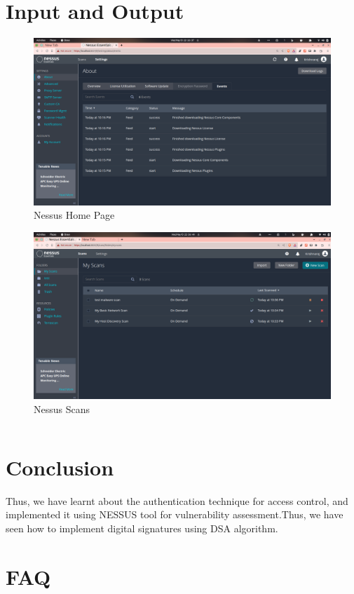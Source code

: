 \documentclass[11pt]{article}
\begin{document}
\section{Input and Output}
\begin{figure}[H]
    \centering
    \includegraphics[width=.45\textwidth]{nessus 1.png}
    \caption{Nessus Home Page}
\end{figure}
\begin{figure}[H]
    \centering
    \includegraphics[width=.45\textwidth]{nessus 2.png}
    \caption{Nessus Scans}
\end{figure}
\begin{verbatim}
\end{verbatim}


% 

\section{Conclusion}
Thus, we have learnt about the authentication technique for access control, and implemented it using NESSUS tool for vulnerability assessment.Thus, we have seen how to implement digital signatures using DSA algorithm.
\clearpage

\section{FAQ}
\end{document}
